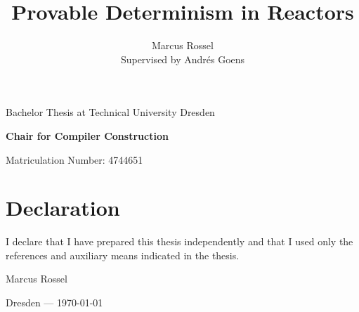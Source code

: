 \documentclass{article}
\title{Provable Determinism in Reactors}
\author{Marcus Rossel\\\small Supervised by Andrés Goens}
\begin{document}

\maketitle

\vspace{10mm}

\begin{center}
\large Bachelor Thesis at Technical University Dresden

\vspace{1mm}

\textbf{Chair for Compiler Construction}

\vspace{4mm}

\normalsize Matriculation Number: 4744651
\end{center}



\newpage

\section*{Declaration}

I declare that I have prepared this thesis independently and that I used only the references and auxiliary means indicated in the thesis.

\vspace{15mm}

\noindent Marcus Rossel

\vspace{1mm}

\noindent Dresden --- \today

\newpage


\newpage

\small
\tableofcontents
\normalsize

\newpage
{}
\setcounter{page}{1}


\newpage

\newpage

\newpage

\newpage

\newpage


\newpage

\appendix


\newpage


\end{document}

